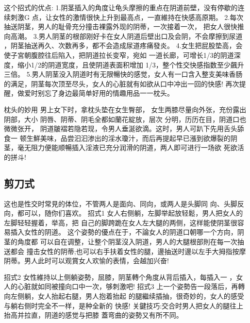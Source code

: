 \documentclass[12pt,UTF8]{ctexbook}
\begin{document}
这个招式的优点:
1.阴茎插入的角度让龟头摩擦的重点在阴道前壁，没有停歇的连续刺激G
点，让女性的激情很快上升到最高点，一直維持在快感高原期。
2.每次抽送阴茎，男人的耻骨充分撞击裸露外现的阴蒂，一次接着一次，
把女人很快推向高潮。
3.男人阴茎的根部刚好卡在女人阴道后壁出口及会阴，不会摩擦到尿道
，阴茎抽送再久、次数再多，都不会造成尿道疼痛發炎。
4.女生把屁股垫高，会使子宮朝腹腔往后陷入，把阴道拉长变窄，宛如
一道长廊，可增长1/3的阴道深度，缩小1/2的阴道宽度，且使阴道表面积增加
1/3，整个性交快感指数至少飆升三倍。
5.男人阴茎没入阴道时有无限暢快的感觉，女人有一口含入整支美味香肠
的满足，阴茎每次顶至尽头，女人的心脏就有如欲从口中冲出一回的快感!
再次提醒，做爱时别忘了身边最简单好用的情趣用品一一枕头。

枕头的妙用
男上女下时，拿枕头垫在女生臀部，
女生两膝尽量向外张，充份露出阴部，大小
阴唇、阴蒂、阴毛全都如蘭花綻放，层次
分明，历历在目，阴道口也微微张开，
阴道皺褶若隐若现，令男人垂涎欲滴。这时，男人可趴下先用舌头舔食一
顿生鮮美味，品尝汩汩渗出的淫水瓊汁，而后再提起早已漲到欲爆裂的阴
茎，毫无阻力便能顺暢插入淫液已充分润滑的阴道，两人即可进行一场欲
死欲活的拼斗!

\subsection{剪刀式}

这也是性交时常見的体位，不管两人是面向、同向，或两人是头脚同
向、头脚反向，都可以，随你们喜欢。
招式1
女人右侧躺，左脚举起放轻鬆，男人把女人的左脚轻轻握着，举高，把
自己的脚跨跪在女人左大腿的两侧，这样能使阴茎很容易插入女性的阴道。
这个姿勢的優点在于，不論女人的阴道口朝哪一个方向，阴茎的角度都
可以自在调整，让整个阴茎沒入阴道，男人的大腿根部則在每一次抽送都会
撞击女性的阴蒂;也可以右手扶着女性的腿，邊抽送时邊以左手大拇指按摩
阴蒂。男人此时可以观賞女人欢愉的表情，会越加兴奋!

招式2
女性維持以上侧躺姿勢，屈膝，阴茎轉个角度从背后插入，每插入一
，女人的心脏就如同被撞向口中一次，够刺激吧!
招式3
上一个姿勢告一段落后，再轉向左侧躺，女人抬起右腿，男人抱着抬起
的腿繼续插抽，很奇妙的，女人的感受与躺右侧时完全不一样，是种全新的
快感!
关鍵技巧:交合时男人把女人的腿往上抬高并拉直，阴道的感觉与把膝
蓋弯曲的姿勢又有所不同。
\end{document}

